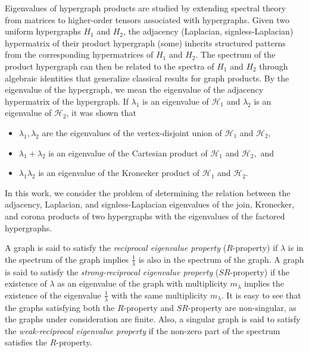 \documentclass[10pt,a4paper]{article}
\begin{document}
	
	Eigenvalues of hypergraph products are studied by extending spectral theory from matrices to higher-order tensors associated with hypergraphs. Given two uniform hypergraphs $H_1$ and $H_2$, the adjacency (Laplacian, signless-Laplacian) hypermatrix of their product hypergraph (some) inherits structured patterns from the corresponding hypermatrices of $H_1$ and $H_2$. The spectrum of the product hypergraph can then be related to the spectra of $H_1$ and $H_2$ through algebraic identities that generalize classical results for graph products.
	By the eigenvalue of the hypergraph, we mean the eigenvalue of the adjacency hypermatrix of the hypergraph. 
	If $\lambda_1$ is an eigenvalue of $\mathcal{H}_1$ and $\lambda_2$ is an eigenvalue of $\mathcal{H}_2$, it was shown that
	
	\begin{itemize}
		\item \cite{cooper2012spectra} $\lambda_1, \lambda_2$ are the eigenvalues of the vertex-disjoint union of $\mathcal{H}_1$ and $\mathcal{H}_2,$ 
		\item \cite{cooper2012spectra} $\lambda_1 + \lambda_2$ is an eigenvalue of the Cartesian product of $\mathcal{H}_1$ and $\mathcal{H}_2,$ and 
		\item \cite{pearson2013eigenvalues,shao2013general} $\lambda_1\lambda_2$ is an eigenvalue of the Kronecker product of $\mathcal{H}_1$ and $\mathcal{H}_2. $
	\end{itemize}
	
	In this work, we consider the problem of determining the relation between the adjacency, Laplacian, and signless-Laplacian eigenvalues of the join, Kronecker, and corona products of two hypergraphs with the eigenvalues of the factored hypergraphs.
	
	
	A graph is said to satisfy the \textit{reciprocal eigenvalue property} ($R$-property) \cite{barik2007spectrum} if $\lambda$ is in the spectrum of the graph implies $\frac{1}{\lambda}$ is also in the spectrum of the graph. 
	A graph is said to satisfy the \textit{strong-reciprocal eigenvalue property} ($SR$-property) \cite{barik2007spectrum} if the existence of $\lambda$ as an eigenvalue of the graph with multiplicity $m_{\lambda}$ implies the existence of the eigenvalue $\frac{1}{\lambda}$ with the same multiplicity $m_{\lambda}$. It is easy to see that the graphs satisfying both the $R$-property and $SR$-property are non-singular, as the graphs under consideration are finite. 
	Also, a singular graph is said to satisfy the \textit{weak-reciprocal eigenvalue property} \cite{barik2007spectrum} if the non-zero part of the spectrum satisfies the $R$-property.
	
\end{document}

